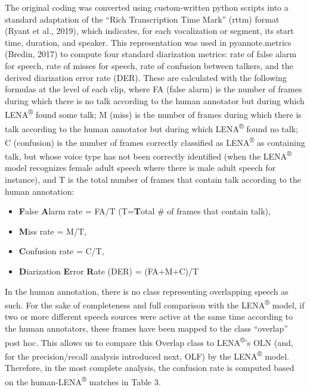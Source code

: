 \documentclass[english,table,man,floatsintext]{apa6}
\providecommand{\tightlist}{%
  \setlength{\itemsep}{0pt}\setlength{\parskip}{0pt}}
\begin{document}
The original coding was converted using custom-written python scripts into a standard adaptation of the \enquote{Rich Transcription Time Mark} (rttm) format (Ryant et al., 2019), which indicates, for each vocalization or segment, its start time, duration, and speaker. This representation was used in pyannote.metrics (Bredin, 2017) to compute four standard diarization metrics: rate of false alarm for speech, rate of misses for speech, rate of confusion between talkers, and the derived diarization error rate (DER). These are calculated with the following formulas at the level of each clip, where FA (false alarm) is the number of frames during which there is no talk according to the human annotator but during which LENA\textsuperscript{®} found some talk; M (miss) is the number of frames during which there is talk according to the human annotator but during which LENA\textsuperscript{®} found no talk; C (confusion) is the number of frames correctly classified as LENA\textsuperscript{®} as containing talk, but whose voice type has not been correctly identified (when the LENA\textsuperscript{®} model recognizes female adult speech where there is male adult speech for instance), and T is the total number of frames that contain talk according to the human annotation:

\begin{itemize}
\tightlist
\item
  \textbf{F}alse \textbf{A}larm rate = FA/T (T=\textbf{T}otal \# of frames that contain talk),
\item
  \textbf{M}iss rate = M/T,
\item
  \textbf{C}onfusion rate = C/T,
\item
  \textbf{D}iarization \textbf{E}rror \textbf{R}ate (DER) = (FA+M+C)/T
\end{itemize}

In the human annotation, there is no class representing overlapping speech as such. For the sake of completeness and full comparison with the LENA\textsuperscript{®} model, if two or more different speech sources were active at the same time according to the human annotators, these frames have been mapped to the class \enquote{overlap} post hoc. This allows us to compare this Overlap class to LENA\textsuperscript{®}'s OLN (and, for the precision/recall analysis introduced next, OLF) by the LENA\textsuperscript{®} model. Therefore, in the most complete analysis, the confusion rate is computed based on the human-LENA\textsuperscript{®} matches in Table 3.
\end{document}
